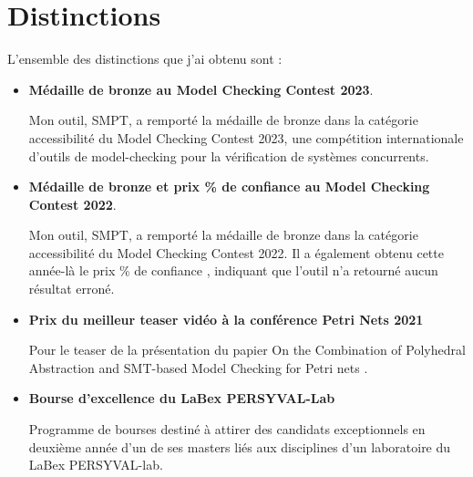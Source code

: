 \label{sec:rayonnement}


\vspace{10pt}
\section{Distinctions}
\vspace{10pt}
L'ensemble des distinctions que j'ai obtenu sont :

\begin{itemize}
  \item \textbf{Médaille de bronze au Model Checking Contest 2023}.
  \begin{mdframed}
    
    Mon outil, \textsf{SMPT}, a remporté la médaille de bronze dans la catégorie
    \og accessibilité \fg du Model Checking Contest 2023, une compétition
    internationale d'outils de model-checking pour la vérification de systèmes
    concurrents.
  \end{mdframed}\smallbreak

  \item \textbf{Médaille de bronze et prix \% de confiance \fg au Model
  Checking Contest 2022}. 
  \begin{mdframed}
    Mon outil, \textsf{SMPT}, a remporté la médaille de bronze dans la catégorie
    \og accessibilité \fg du Model Checking Contest 2022. Il a également obtenu cette
    année-là le prix \% de confiance \fg, indiquant que l'outil n'a retourné aucun résultat erroné.  
  \end{mdframed}
  \smallbreak
  \item \textbf{Prix du meilleur teaser vidéo à la conférence Petri Nets 2021}
  \begin{mdframed}
    Pour le teaser de la présentation du papier \og On the Combination of Polyhedral
    Abstraction and SMT-based Model Checking for Petri nets \fg.
  \end{mdframed}\smallbreak
  \item \textbf{Bourse d'excellence du LaBex PERSYVAL-Lab}
  \begin{mdframed}
    Programme de bourses destiné à attirer des candidats exceptionnels en deuxième
    année d'un de ses masters liés aux disciplines d'un laboratoire du LaBex
    PERSYVAL-lab.
  \end{mdframed}

\end{itemize}

\vspace{10pt}
